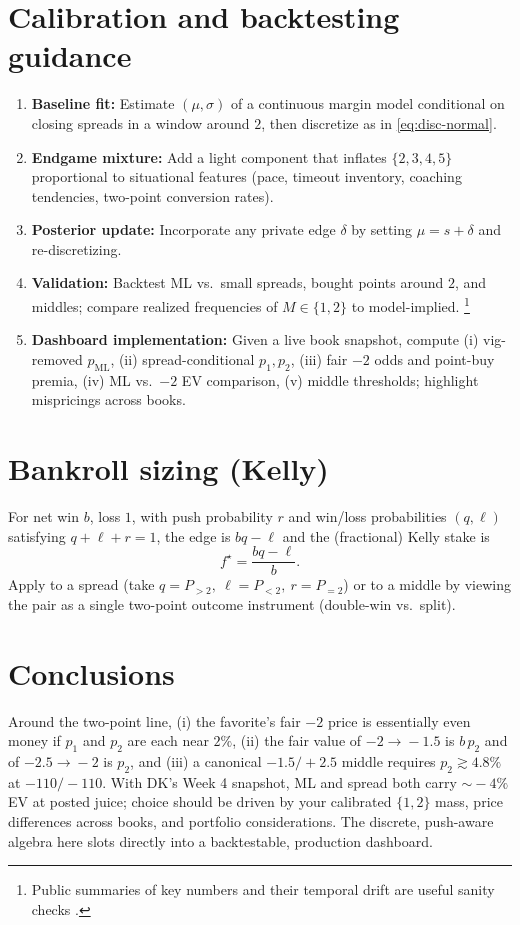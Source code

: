 \documentclass[11pt]{amsart}
\begin{document}
\section{Calibration and backtesting guidance}
\begin{enumerate}[leftmargin=2em,label=\arabic*.]
\item \textbf{Baseline fit:} Estimate $(\mu,\sigma)$ of a continuous margin model conditional on closing spreads in a window around $2$, then discretize as in \eqref{eq:disc-normal}.
\item \textbf{Endgame mixture:} Add a light component that inflates $\{2,3,4,5\}$ proportional to situational features (pace, timeout inventory, coaching tendencies, two-point conversion rates).
\item \textbf{Posterior update:} Incorporate any private edge $\delta$ by setting $\mu=s+\delta$ and re-discretizing.
\item \textbf{Validation:} Backtest ML vs.\ small spreads, bought points around $2$, and middles; compare realized frequencies of $M\in\{1,2\}$ to model-implied.%
\footnote{Public summaries of key numbers and their temporal drift are useful sanity checks \cite{Boyds-KeyNumbers,Action-KeyNumbers-2024}.}
\item \textbf{Dashboard implementation:} Given a live book snapshot, compute (i) vig-removed $p_{\mathrm{ML}}$, (ii) spread-conditional $p_1,p_2$, (iii) fair $-2$ odds and point-buy premia, (iv) ML vs.\ $-2$ EV comparison, (v) middle thresholds; highlight mispricings across books.
\end{enumerate}

\section*{Bankroll sizing (Kelly)}
For net win $b$, loss $1$, with push probability $r$ and win/loss probabilities $(q,\ell)$ satisfying $q+\ell+r=1$, the edge is $bq-\ell$ and the (fractional) Kelly stake is
\[
f^\star=\frac{bq-\ell}{b}.
\]
Apply to a spread (take $q=P_{>2},\ \ell=P_{<2},\ r=P_{=2}$) or to a middle by viewing the pair as a single two-point outcome instrument (double-win vs.\ split).

\section*{Conclusions}
Around the two-point line, (i) the favorite’s fair $-2$ price is essentially even money if $p_1$ and $p_2$ are each near $2\%$, (ii) the fair value of $-2\!\to\!-1.5$ is $b\,p_2$ and of $-2.5\!\to\!-2$ is $p_2$, and (iii) a canonical $-1.5/+2.5$ middle requires $p_2\gtrsim 4.8\%$ at $-110/-110$. With DK’s Week 4 snapshot, ML and spread both carry $\sim\!{-}4\%$ EV at posted juice; choice should be driven by your calibrated $\{1,2\}$ mass, price differences across books, and portfolio considerations. The discrete, push-aware algebra here slots directly into a backtestable, production dashboard.

\bigskip



\end{document}
